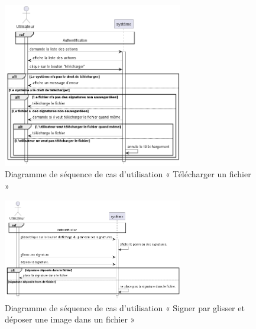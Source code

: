 \begin{figure}[H]
  \centering
  \includegraphics[width=0.7\textwidth]{out/diagrams/sprint4/download_file/download_file}
  \caption{Diagramme de séquence de cas d'utilisation « Télécharger un fichier   »}
  \label{fig:sequence_download_file}
\end{figure}
\begin{figure}[H]
  \centering
  \includegraphics[width=0.7\textwidth]{out/diagrams/sprint4/sign_by_image/sign_by_image}
  \caption{Diagramme de séquence de cas d'utilisation « Signer par glisser et déposer une image dans un fichier   »}
  \label{fig:sequence_sign_by_image}
\end{figure}


